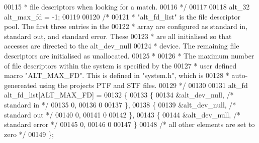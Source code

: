 \begin{DoxyCode}
00115 \textcolor{comment}{ * file descriptors when looking for a match.}
00116 \textcolor{comment}{ */}
00117 
00118 alt_32 alt_max_fd = -1;
00119 
00120 \textcolor{comment}{/*}
00121 \textcolor{comment}{ * "alt\_fd\_list" is the file descriptor pool. The first three entries in the}
00122 \textcolor{comment}{ * array are configured as standard in, standard out, and standard error. These}
00123 \textcolor{comment}{ * are all initialised so that accesses are directed to the alt\_dev\_null }
00124 \textcolor{comment}{ * device. The remaining file descriptors are initialised as unallocated.}
00125 \textcolor{comment}{ *}
00126 \textcolor{comment}{ * The maximum number of file descriptors within the system is specified by the}
00127 \textcolor{comment}{ * user defined macro "ALT\_MAX\_FD". This is defined in "system.h", which is }
00128 \textcolor{comment}{ * auto-genereated using the projects PTF and STF files.}
00129 \textcolor{comment}{ */}
00130 
00131 alt_fd alt_fd_list[ALT_MAX_FD] = 
00132   \{
00133     \{
00134       &alt_dev_null, \textcolor{comment}{/* standard in */}
00135       0,
00136       0
00137     \},
00138     \{
00139       &alt_dev_null, \textcolor{comment}{/* standard out */}
00140       0,
00141       0
00142     \},
00143     \{
00144       &alt_dev_null, \textcolor{comment}{/* standard error */}
00145       0,
00146       0
00147     \}
00148     \textcolor{comment}{/* all other elements are set to zero */}
00149   \};
\end{DoxyCode}
